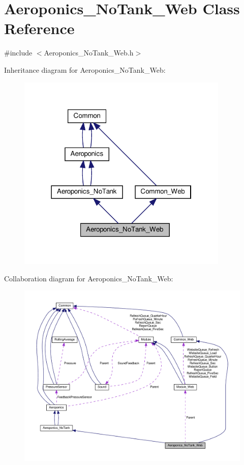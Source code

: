 \hypertarget{class_aeroponics___no_tank___web}{}\section{Aeroponics\+\_\+\+No\+Tank\+\_\+\+Web Class Reference}
\label{class_aeroponics___no_tank___web}


{\ttfamily \#include $<$Aeroponics\+\_\+\+No\+Tank\+\_\+\+Web.\+h$>$}



Inheritance diagram for Aeroponics\+\_\+\+No\+Tank\+\_\+\+Web\+:
\nopagebreak
\begin{figure}[H]
\begin{center}
\leavevmode
\includegraphics[width=286pt]{class_aeroponics___no_tank___web__inherit__graph}
\end{center}
\end{figure}


Collaboration diagram for Aeroponics\+\_\+\+No\+Tank\+\_\+\+Web\+:
\nopagebreak
\begin{figure}[H]
\begin{center}
\leavevmode
\includegraphics[width=350pt]{class_aeroponics___no_tank___web__coll__graph}
\end{center}
\end{figure}
